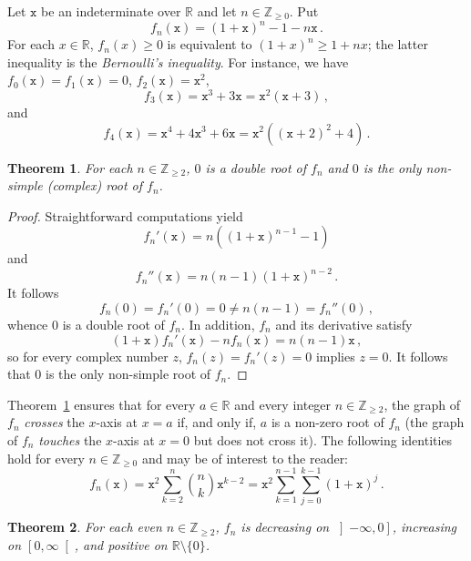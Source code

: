 \documentclass[12pt]{article}
\newcommand{\bZ}{\mathbb{Z}}
\newcommand{\bR}{\mathbb{R}}
\newcommand{\bN}[1]{\bZ_{\ge #1}}
\newcommand{\ttx}{\mathtt{x}}
\newtheorem{theorem}{Theorem}
\begin{document}
\sloppy

Let $\ttx$ be an indeterminate over $\bR$ and let $n \in \bN{0}$.
Put
$$
f_n(\ttx) = {(1 + \ttx)}^n - 1 - n \ttx \, .
$$
For each $x \in \bR$, $f_n(x) \ge 0$ is equivalent to ${(1 + x)}^n \ge 1 + n x$; 
the latter inequality is the \emph{Bernoulli's inequality}.
For instance, we have 
$f_0(\ttx) = f_1(\ttx) = 0$,
$f_2(\ttx) = \ttx^2$,
$$
f_3(\ttx) = \ttx^3 + 3 \ttx = \ttx^2 (\ttx + 3) \,,
$$
and 
$$
f_4(\ttx) = \ttx^4 + 4 \ttx^3 + 6 \ttx = \ttx^2 \left( {(\ttx + 2)}^2 + 4 \right)  \, .
$$

\begin{theorem} \label{thm:root-mult}
  For each $n \in \bN{2}$,
  $0$ is a double root of $f_n$ and $0$ is the only non-simple (complex) root of $f_n$.
\end{theorem}

\begin{proof}
  Straightforward computations yield
  \begin{equation} \label{eq:deriv-fn} 
  f_n'(\ttx)  = n \left( {(1 + \ttx)}^{n - 1} -  1 \right) 
  \end{equation}
  and
  $$
  f_n''(\ttx)  = n (n - 1) {(1 + \ttx)}^{n - 2} \,.
  $$
  It follows
  $$
  f_n(0) = f_n'(0) = 0 \ne n (n - 1) = f_n''(0) \, ,
  $$
  whence $0$ is a double root of $f_n$.
  In addition, $f_n$ and its derivative satisfy 
   $$
   (1 + \ttx) f_n'(\ttx) - n f_n(\ttx) = n (n - 1) \ttx \, ,
   $$
   so for every complex number $z$, $f_n(z) = f_n'(z) = 0$ implies $z = 0$.
   It follows that $0$ is the only non-simple root of $f_n$.
 \end{proof}
 
Theorem~\ref{thm:root-mult} ensures that for every $a \in \bR$ and every integer $n \in \bN{2}$,
the graph of $f_n$ \emph{crosses} the $x$-axis at $x = a$ if, and only if, $a$ is a non-zero root of $f_n$
(the graph of $f_n$ \emph{touches} the $x$-axis at $x = 0$ but does not cross it).
 The following identities hold for every $n \in \bN{0}$ and may be of interest to the reader:
 $$
 f_n (\ttx)
 = \ttx^2 \sum_{k = 2}^n \binom{n}{k} \ttx^{k - 2}
 = \ttx^2 \sum_{k = 1}^{n - 1}  \sum_{j = 0}^{k - 1} {(1 + \ttx)}^j \, .  
 $$



 \begin{theorem} \label{thm:n-is-even}
   For each even  $n \in \bN{2}$, $f_n$ is
   decreasing on $\left]-\infty, 0 \right]$,
   increasing on $\left[0, \infty \right[$, and
   positive on $\bR \setminus \{ 0 \}$.
 \end{theorem}
\end{document}
